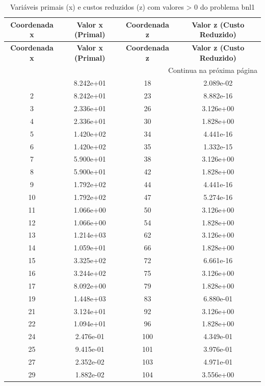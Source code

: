 \documentclass[12pt]{article}
\begin{document}
\begin{longtable}{@{}cccc@{}}
\caption{Variáveis primais (x) e custos reduzidos (z) com valores > 0 do problema bnl1} \\
\toprule
\textbf{Coordenada x} & \textbf{Valor x (Primal)} & \textbf{Coordenada z} & \textbf{Valor z (Custo Reduzido)} \\
\midrule
\endfirsthead

\toprule
\textbf{Coordenada x} & \textbf{Valor x (Primal)} & \textbf{Coordenada z} & \textbf{Valor z (Custo Reduzido)} \\
\midrule
\endhead

\midrule \multicolumn{4}{r}{{Continua na próxima página}} \\ \midrule
\endfoot

\bottomrule
\endlastfoot
1 & 8.242e+01 & 18 & 2.089e-02 \\
2 & 8.242e+01 & 23 & 8.882e-16 \\
3 & 2.336e+01 & 26 & 3.126e+00 \\
4 & 2.336e+01 & 30 & 1.828e+00 \\
5 & 1.420e+02 & 34 & 4.441e-16 \\
6 & 1.420e+02 & 35 & 1.332e-15 \\
7 & 5.900e+01 & 38 & 3.126e+00 \\
8 & 5.900e+01 & 42 & 1.828e+00 \\
9 & 1.792e+02 & 44 & 4.441e-16 \\
10 & 1.792e+02 & 47 & 5.274e-16 \\
11 & 1.066e+00 & 50 & 3.126e+00 \\
12 & 1.066e+00 & 54 & 1.828e+00 \\
13 & 1.214e+03 & 62 & 3.126e+00 \\
14 & 1.059e+01 & 66 & 1.828e+00 \\
15 & 3.325e+02 & 72 & 6.661e-16 \\
16 & 3.244e+02 & 75 & 3.126e+00 \\
17 & 8.092e+00 & 79 & 1.828e+00 \\
19 & 1.448e+03 & 83 & 6.880e-01 \\
21 & 3.124e+01 & 92 & 3.126e+00 \\
22 & 1.094e+01 & 96 & 1.828e+00 \\
24 & 2.476e-01 & 100 & 4.349e-01 \\
25 & 9.415e-01 & 101 & 3.976e-01 \\
27 & 2.352e-02 & 103 & 4.971e-01 \\
29 & 1.882e-02 & 104 & 3.556e+00 \\

\end{longtable}
\end{document}
